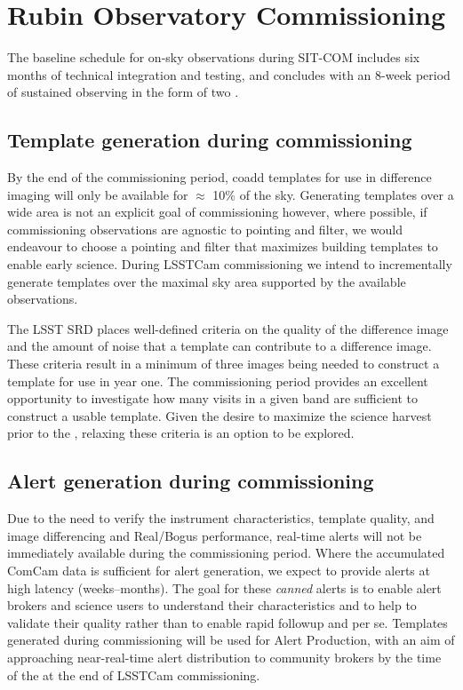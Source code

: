 \section{Rubin Observatory Commissioning} 
\label{sec:commissioning}

The baseline schedule for on-sky observations during SIT-COM includes six months of technical integration and testing, and concludes with an 8-week period of sustained observing in the form of two \svs \citep{SCTN-007}. 

\subsection{Template generation during commissioning}

By the end of the commissioning period, coadd templates for use in difference imaging will only be available for $\approx$ 10\% of the sky. 
Generating templates over a wide area is not an explicit goal of commissioning however, where possible, if commissioning observations are agnostic to pointing and filter, we would endeavour to choose a pointing and filter that maximizes building templates to enable early science. 
During LSSTCam commissioning we intend to incrementally generate templates over the maximal sky area supported by the available observations.

The LSST SRD places well-defined criteria on the quality of the difference image and the amount of noise that a template can contribute to a difference image.  
These criteria result in a minimum of three images being needed to construct a template for use in year one.  
The commissioning period provides an excellent opportunity to investigate how many visits in a given band are sufficient to construct a usable template. 
Given the desire to maximize the science harvest prior to the \drone,  relaxing these criteria is an option to be explored. 

\subsection{Alert generation during commissioning}

Due to the need to verify the instrument characteristics, template quality, and image differencing and Real/Bogus performance, real-time alerts will not be immediately available during the commissioning period. 
Where the accumulated ComCam data is sufficient for alert generation, we expect to provide alerts at high latency (weeks--months). 
The goal for these {\it canned} alerts is to enable alert brokers and science users to understand their characteristics and to help to validate their quality rather than to enable rapid followup and \es per se.
Templates generated during commissioning will be used for Alert Production, with an aim of approaching near-real-time alert distribution to community brokers by the time of the \svs at the end of LSSTCam commissioning. 

